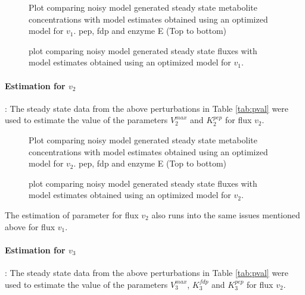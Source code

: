 \documentclass[10pt]{report}
\begin{document}
	\begin{figure}[!tbhp]
		\caption{Plot comparing noisy model generated steady state metabolite concentrations with model estimates obtained using an optimized model for $v_1$. pep, fdp and enzyme E (Top to bottom)}
	\end{figure}
	\begin{figure}[!tbhp]
		\caption{plot comparing noisy model generated steady state fluxes with model estimates obtained using an optimized model for $v_1$.}
	\end{figure}
	\clearpage

	\paragraph{Estimation for $v_2$}: The steady state data from the above perturbations in Table \ref{tab:pval} were used to estimate the value of the parameters $V_2^{max}$ and $K_2^{pep}$ for flux $v_2$.
		
	\begin{figure}[!tbhp]
		\caption{Plot comparing noisy model generated steady state metabolite concentrations with model estimates obtained using an optimized model for $v_2$. pep, fdp and enzyme E (Top to bottom)}
	\end{figure}
	\begin{figure}[!tbhp]
		\caption{plot comparing noisy model generated steady state fluxes with model estimates obtained using an optimized model for $v_2$.}
	\end{figure}

	The estimation of parameter for flux $v_2$ also runs into the same issues mentioned above for flux $v_1$.	
	
	\paragraph{Estimation for $v_3$}: The steady state data from the above perturbations in Table \ref{tab:pval} were used to estimate the value of the parameters $V_3^{max}$, $K_3^{fdp}$ and $K_3^{pep}$ for flux $v_2$. 
	
\end{document}
